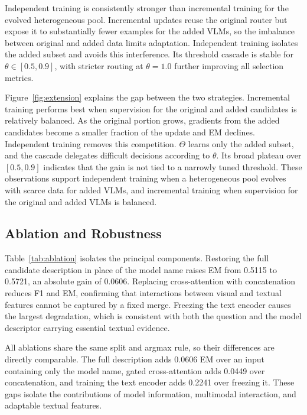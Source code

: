 \documentclass[letterpaper]{article}
\begin{document}
Independent training is consistently stronger than incremental training for the
evolved heterogeneous pool. Incremental updates reuse the original router but
expose it to substantially fewer examples for the added VLMs, so the imbalance
between original and added data limits adaptation. Independent training isolates
the added subset and avoids this interference. Its threshold cascade is stable for
$\theta\in[0.5,0.9]$, with stricter routing at $\theta=1.0$ further improving
all selection metrics.

Figure~\ref{fig:extension} explains the gap between the two strategies.
Incremental training performs best when supervision for the original and added
candidates is relatively balanced. As the original portion
grows, gradients from the added candidates become a smaller fraction of the
update and EM declines. Independent training removes this competition. $\Theta$
learns only the added subset, and the cascade delegates difficult decisions
according to $\theta$. Its broad plateau over $[0.5,0.9]$ indicates that the
gain is not tied to a narrowly tuned threshold. These observations support
independent training when a heterogeneous pool evolves with scarce data for
added VLMs, and incremental training when supervision for the original and added
VLMs is balanced.

\subsection{Ablation and Robustness}

Table~\ref{tab:ablation} isolates the principal components. Restoring the full
candidate description in place of the model name raises EM from 0.5115 to
0.5721, an absolute gain of 0.0606.
Replacing cross-attention with concatenation reduces F1 and EM, confirming that
interactions between visual and textual features cannot be captured by a fixed
merge. Freezing the text
encoder causes the largest degradation, which is consistent with both the
question and the model descriptor carrying essential textual evidence.

All ablations share the same split and argmax rule, so their differences are
directly comparable. The full description adds 0.0606 EM over an input containing
only the model name, gated cross-attention adds 0.0449 over concatenation, and training the
text encoder adds 0.2241 over freezing it. These gaps isolate the contributions
of model information, multimodal interaction, and adaptable textual features.
\end{document}
